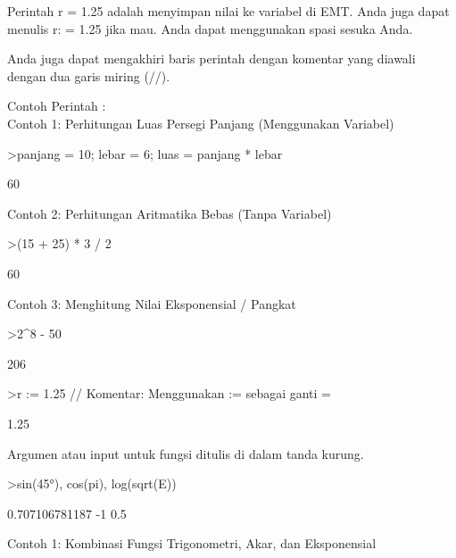 \documentclass{article}
\newenvironment{eulernotebook}{\par}{\par}
\newenvironment{eulercomment}{\par\medskip}{\par\medskip}
\begin{document}
\begin{eulernotebook}
\begin{eulercomment}
Perintah r = 1.25 adalah menyimpan nilai ke variabel di EMT. Anda juga
dapat menulis r: = 1.25 jika mau. Anda dapat menggunakan spasi sesuka
Anda.

Anda juga dapat mengakhiri baris perintah dengan komentar yang diawali
dengan dua garis miring (//).

Contoh Perintah :\\
Contoh 1: Perhitungan Luas Persegi Panjang (Menggunakan Variabel)
\end{eulercomment}
\begin{eulerprompt}
>panjang = 10; lebar = 6; luas = panjang * lebar
\end{eulerprompt}
\begin{euleroutput}
  60
\end{euleroutput}
\begin{eulercomment}
Contoh 2: Perhitungan Aritmatika Bebas (Tanpa Variabel)
\end{eulercomment}
\begin{eulerprompt}
>(15 + 25) * 3 / 2
\end{eulerprompt}
\begin{euleroutput}
  60
\end{euleroutput}
\begin{eulercomment}
Contoh 3: Menghitung Nilai Eksponensial / Pangkat
\end{eulercomment}
\begin{eulerprompt}
>2^8 - 50
\end{eulerprompt}
\begin{euleroutput}
  206
\end{euleroutput}
\begin{eulerprompt}
>r := 1.25 // Komentar: Menggunakan  := sebagai ganti =
\end{eulerprompt}
\begin{euleroutput}
  1.25
\end{euleroutput}
\begin{eulercomment}
Argumen atau input untuk fungsi ditulis di dalam tanda kurung.
\end{eulercomment}
\begin{eulerprompt}
>sin(45°), cos(pi), log(sqrt(E))
\end{eulerprompt}
\begin{euleroutput}
  0.707106781187
  -1
  0.5
\end{euleroutput}
\begin{eulercomment}
Contoh 1: Kombinasi Fungsi Trigonometri, Akar, dan Eksponensial
\end{eulercomment}

\end{eulernotebook}
\end{document}
